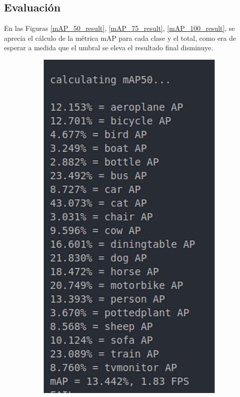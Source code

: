 \subsection{Evaluación}
En las Figuras \ref{mAP_50_result}, \ref{mAP_75_result}, \ref{mAP_100_result}, se aprecia el cálculo de la métrica mAP para cada clase y el total, como era de esperar a medida que el umbral se eleva el resultado final disminuye.
\begin{figure}[H]
     \centering
     \begin{subfigure}[b]{0.4\textwidth}
        \centering
        \includegraphics[scale=0.15]{Recursos/mAP50_result.jpg}

\end{subfigure}
\end{figure}
